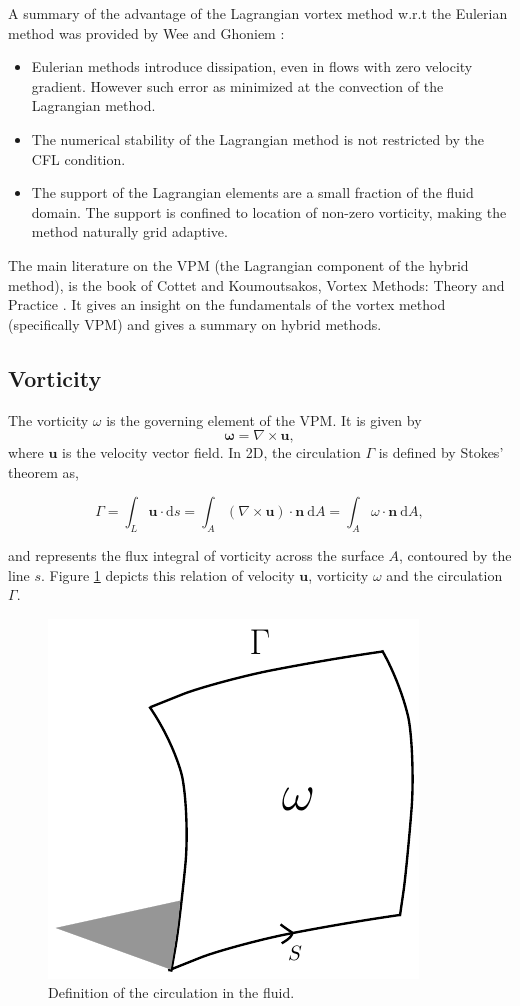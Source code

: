 A summary of the advantage of the Lagrangian vortex method w.r.t the Eulerian method was provided by Wee and Ghoniem \cite{Wee2006a}:
\begin{itemize}
\item Eulerian methods introduce dissipation, even in flows with zero velocity gradient. However such error as minimized at the convection of the Lagrangian method.
\item The numerical stability of the Lagrangian method is not restricted by the CFL condition.
\item The support of the Lagrangian elements are a small fraction of the fluid domain. The support is confined to location of non-zero vorticity, making the method naturally grid adaptive.
\end{itemize}

The main literature on the VPM (the Lagrangian component of the hybrid method), is the book of Cottet and Koumoutsakos, Vortex Methods: Theory and Practice \cite{Cottet2000a}. It gives an insight on the fundamentals of the vortex method (specifically VPM) and gives a summary on hybrid methods.

\subsection{Vorticity}
The vorticity $\omega$ is the governing element of the VPM. It is given by
	\begin{equation}
	\mathbf{\omega} = \nabla \times \mathbf{u},
	\label{eq:lag_vort}
	\end{equation}
where $\mathbf{u}$ is the velocity vector field. In 2D, the circulation $\Gamma$ is defined by Stokes' theorem as,

	\begin{equation}
	\Gamma = \int_L\mathbf{u}\cdot \mathrm{d}s= \int_A (\nabla \times \mathbf{u}) \cdot \mathbf{n}\ \mathrm{d}A = \int_A\omega\cdot\mathbf{n}\ \mathrm{d}A,
	\label{eq:definitionOfCirculation}
	\end{equation}

and represents the flux integral of vorticity across the surface $A$, contoured by the line $s$. Figure \ref{fig:vorticityCirculation} depicts this relation of velocity $\mathbf{u}$, vorticity $\omega$ and the circulation $\Gamma$.

	\begin{figure}[!h]
	\centering
	\includegraphics[width=0.3\linewidth]{./figures/lagrangian/vorticityCirculation_updated.pdf}
	\caption{Definition of the circulation in the fluid.}
	\label{fig:vorticityCirculation}
	\end{figure}


